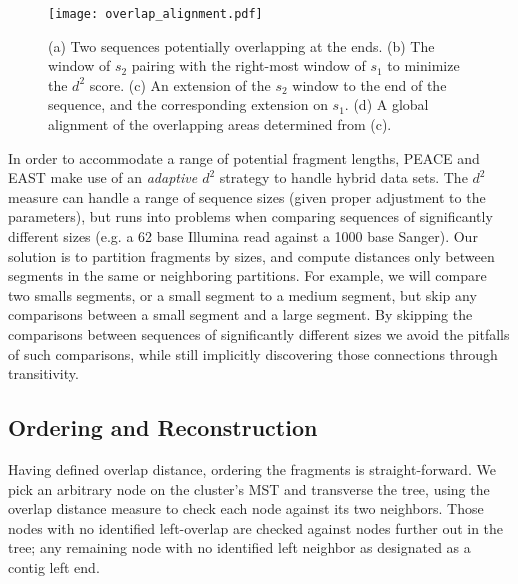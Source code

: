 \documentclass{bioinfo}
\newcommand{\peace} {{\small PEACE}}
\newcommand{\east} {{\small EAST}}
\begin{document}
\begin{figure}
\centerline{\texttt{[image: overlap\_alignment.pdf]}}
\caption{(a) Two sequences potentially overlapping at the ends.  (b)
  The window of $s_2$ pairing with the right-most window of $s_1$ to
  minimize the $d^2$ score.  (c) An extension of the $s_2$ window to
  the end of the sequence, and the corresponding extension on $s_1$.
  (d) A global alignment of the overlapping areas determined from
  (c).}\label{fig:overlap}
\end{figure}


In order to accommodate a range of potential fragment lengths,
\peace\/ and \east\/ make use of an {\it adaptive $d^2$} strategy to
handle hybrid data sets.  The $d^2$ measure can handle a range of
sequence sizes (given proper adjustment to the parameters), but runs
into problems when comparing sequences of significantly different
sizes (e.g. a 62 base Illumina read against a 1000 base Sanger).  Our
solution is to partition fragments by sizes, and compute distances
only between segments in the same or neighboring partitions.  For
example, we will compare two smalls segments, or a small segment to a
medium segment, but skip any comparisons between a small segment and a
large segment.  By skipping the comparisons between sequences of
significantly different sizes we avoid the pitfalls of such
comparisons, while still implicitly discovering those connections
through transitivity.

\subsection*{Ordering and Reconstruction}

Having defined overlap distance, ordering the fragments is
straight-forward.  We pick an arbitrary node on the cluster's MST and
transverse the tree, using the overlap distance measure to check each
node against its two neighbors.  Those nodes with no identified
left-overlap are checked against nodes further out in the tree; any
remaining node with no identified left neighbor as designated as
a contig left end.

\end{document}
